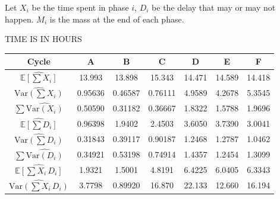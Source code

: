 \documentclass[../Thesis.tex]{subfiles}
\begin{document}
Let $X_{i}$ be the time spent in phase $i$, $D_i$ be the delay that may or may not happen. $M_i$ is the mass at the end of each phase.

TIME IS IN HOURS




\begin{table}[h]
    \centering
    \begin{tabular}{c|cccccc}
        Cycle                                               & A       & B       & C       & D      & E      & F      \\\hline
        $\widehat{\mathbb{E}\left[\sum X_i\right]}$         & 13.993  & 13.898  & 15.343  & 14.471 & 14.589 & 14.418 \\\hline
        $\widehat{\text{Var}\left(\sum X_i\right)}$         & 0.95636 & 0.46587 & 0.76111 & 4.9589 & 4.2678 & 5.3545 \\\hline
        $\sum \widehat{\text{Var}\left(X_i\right)}$         & 0.50590 & 0.31182 & 0.36667 & 1.8322 & 1.5788 & 1.9696 \\\hline
        $\widehat{\mathbb{E} \left[\sum D_i\right]}$        & 0.96398 & 1.9402  & 2.4503  & 3.6050 & 3.7390 & 3.0041 \\\hline
        $\widehat{ \text{Var} \left(\sum D_i\right)}$       & 0.31843 & 0.39117 & 0.90187 & 1.2468 & 1.2787 & 1.0462 \\\hline
        $\sum \widehat{\text{Var}\left(D_i\right)}$         & 0.34921 & 0.53198 & 0.74914 & 1.4357 & 1.2454 & 1.3099 \\\hline
        $\widehat{\mathbb{E}\left[\sum X_i\, D_i\right]}$   & 1.9321  & 1.5001  & 4.8191  & 6.4225 & 6.0405 & 6.3343 \\\hline
        $\widehat{\text{Var} \left(\sum X_i \, D_i\right)}$ & 3.7798  & 0.89920 & 16.870  & 22.133 & 12.660 & 16.194
    \end{tabular}
\end{table}
\end{document}
